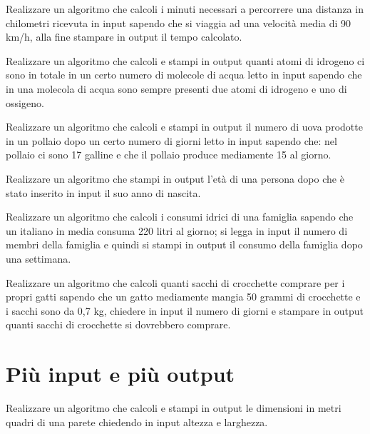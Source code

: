 \begin{exercise}
	Realizzare un algoritmo che calcoli i minuti necessari a percorrere una distanza in chilometri ricevuta in input sapendo che si viaggia ad una velocità media di 90 km/h, alla fine stampare in output il tempo calcolato.
\end{exercise}

\begin{exercise}
	Realizzare un algoritmo che calcoli e stampi in output quanti atomi di idrogeno ci sono in totale in un certo numero di molecole di acqua letto in input sapendo che in una molecola di acqua sono sempre presenti due atomi di idrogeno e uno di ossigeno.
\end{exercise}

\begin{exercise}
	Realizzare un algoritmo che calcoli e stampi in output il numero di uova prodotte in un pollaio dopo un certo numero di giorni letto in input sapendo che: nel pollaio ci sono 17 galline e che il pollaio produce mediamente 15 al giorno.
\end{exercise}

\begin{exercise}
	Realizzare un algoritmo che stampi in output l'età di una persona dopo che è stato inserito in input il suo anno di nascita.
\end{exercise}

\begin{exercise}
	Realizzare un algoritmo che calcoli i consumi idrici di una famiglia sapendo che un italiano in media consuma 220 litri al giorno; si legga in input il numero di membri della famiglia e quindi si stampi in output il consumo della famiglia dopo una settimana.
\end{exercise}

\begin{exercise}
	Realizzare un algoritmo che calcoli quanti sacchi di crocchette comprare per i propri gatti sapendo che un gatto mediamente mangia 50 grammi di crocchette e i sacchi sono da 0,7 kg, chiedere in input il numero di giorni e stampare in output quanti sacchi di crocchette si dovrebbero comprare.
\end{exercise}

\section{Più input e più output}

\begin{exercise}
	Realizzare un algoritmo che calcoli e stampi in output le dimensioni in metri quadri di una parete chiedendo in input altezza e larghezza.
\end{exercise}

